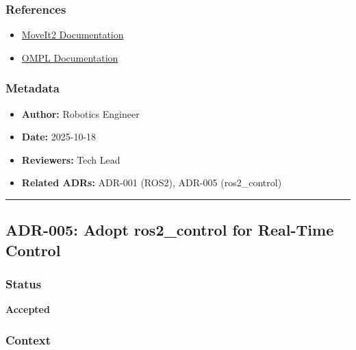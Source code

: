 \documentclass[
]{article}
\providecommand{\tightlist}{%
  \setlength{\itemsep}{0pt}\setlength{\parskip}{0pt}}
\begin{document}
\hypertarget{references-3}{%
\subsubsection{References}\label{references-3}}

\begin{itemize}
\tightlist
\item
  \href{https://moveit.picknik.ai/humble/index.html}{MoveIt2
  Documentation}
\item
  \href{https://ompl.kavrakilab.org/}{OMPL Documentation}
\end{itemize}

\hypertarget{metadata-3}{%
\subsubsection{Metadata}\label{metadata-3}}

\begin{itemize}
\tightlist
\item
  \textbf{Author:} Robotics Engineer
\item
  \textbf{Date:} 2025-10-18
\item
  \textbf{Reviewers:} Tech Lead
\item
  \textbf{Related ADRs:} ADR-001 (ROS2), ADR-005 (ros2\_control)
\end{itemize}

\begin{center}\rule{0.5\linewidth}{0.5pt}\end{center}

\hypertarget{adr-005-adopt-ros2_control-for-real-time-control}{%
\subsection{ADR-005: Adopt ros2\_control for Real-Time
Control}\label{adr-005-adopt-ros2_control-for-real-time-control}}

\hypertarget{status-4}{%
\subsubsection{Status}\label{status-4}}

\textbf{Accepted}

\hypertarget{context-4}{%
\subsubsection{Context}\label{context-4}}
\end{document}

